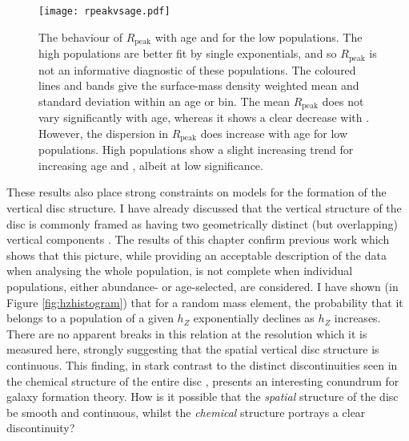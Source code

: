 \begin{figure}
	\texttt{[image: rpeakvsage.pdf]}
	\centering
   \caption[Peak radius of surface density profiles in the low \afe{} mono-age, mono-\feh{} populations in APOGEE DR12, shown as a function of age and \feh{}]{The behaviour of $R_{\mathrm{peak}}$ with age and \feh{} for the low \afe{} populations. The high \afe{} populations are better fit by single exponentials, and so $R_{\mathrm{peak}}$ is not an informative diagnostic of these populations. The coloured lines and bands give the surface-mass density weighted mean and standard deviation within an age or \feh{} bin. The mean $R_{\mathrm{peak}}$ does not vary significantly with age, whereas it shows a clear decrease with \feh{}. However, the dispersion in $R_{\mathrm{peak}}$ does increase with age for low \afe{} populations. High \afe{} populations show a slight increasing trend for increasing age and \feh{}, albeit at low significance. }
    \label{fig:rpeakvsage}
 \end{figure}


These results also place strong constraints on models for the formation of the vertical disc structure. I have already discussed that the vertical structure of the disc is commonly framed as having two geometrically distinct (but overlapping) vertical components \citep[e.g.][]{1983MNRAS.202.1025G}. The results of this chapter confirm previous work \citep[e.g.][]{2012ApJ...751..131B} which shows that this picture, while providing an acceptable description of the data when analysing the whole population, is not complete when individual populations, either abundance- or age-selected, are considered. I have shown (in Figure \ref{fig:hzhistogram}) that for a random mass element, the probability that it belongs to a population of a given $h_Z$ exponentially declines as $h_Z$ increases. There are no apparent breaks in this relation at the resolution which it is measured here, strongly suggesting that the spatial vertical disc structure is continuous. This finding, in stark contrast to the distinct discontinuities seen in the chemical structure of the entire disc \citep[e.g][]{2014ApJ...796...38N,2015ApJ...808..132H}, presents an interesting conundrum for galaxy formation theory. How is it possible that the \emph{spatial} structure of the disc be smooth and continuous, whilst the \emph{chemical} structure portrays a clear discontinuity?

